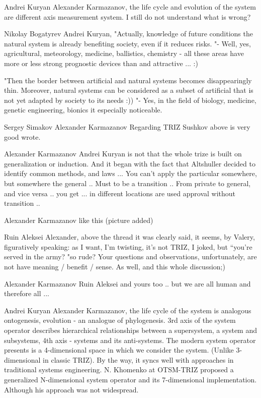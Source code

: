 \documentclass[11pt,a4paper]{article}
\begin{document}
Andrei Kuryan Alexander Karmazanov, the life cycle and evolution of the system
are different axis measurement system. I still do not understand what is
wrong?

Nikolay Bogatyrev Andrei Kuryan, "Actually, knowledge of future conditions the
natural system is already benefiting society, even if it reduces risks. "-
Well, yes, agricultural, meteorology, medicine, ballistics, chemistry - all
these areas have more or less strong prognostic devices than and attractive
... :)

"Then the border between artificial and natural systems becomes disappearingly
thin. Moreover, natural systems can be considered as a subset of artificial
that is not yet adapted by society to its needs :)) "- Yes, in the field of
biology, medicine, genetic engineering, bionics it especially noticeable.

Sergey Simakov Alexander Karmazanov Regarding TRIZ Sushkov above is very good
wrote.

Alexander Karmazanov Andrei Kuryan is not that the whole trize is built on
generalization or induction. And it began with the fact that Altshuller
decided to identify common methods, and laws ... You can’t apply the
particular somewhere, but somewhere the general .. Must to be a transition
.. From private to general, and vice versa .. you get ... in different
locations are used approval without transition ..

Alexander Karmazanov like this (picture added)

Ruin Aleksei Alexander, above the thread it was clearly said, it seems, by
Valery, figuratively speaking: as I want, I’m twisting, it’s not TRIZ, I
joked, but “you’re served in the army? "so rude? Your questions and
observations, unfortunately, are not have meaning / benefit / sense. As well,
and this whole discussion;)

Alexander Karmazanov Ruin Aleksei and yours too .. but we are all human and
therefore all ... 

Andrei Kuryan Alexander Karmazanov, the life cycle of the system is analogous
ontogenesis, evolution - an analogue of phylogenesis. 3rd axis of the system
operator describes hierarchical relationships between a supersystem, a system
and subsystems, 4th axis - systems and its anti-systems. The modern system
operator presents is a 4-dimensional space in which we consider the
system. (Unlike 3-dimensional in classic TRIZ). By the way, it syncs well with
approaches in traditional systems engineering. N. Khomenko at OTSM-TRIZ
proposed a generalized N-dimensional system operator and its 7-dimensional
implementation. Although his approach was not widespread.
\end{document}
